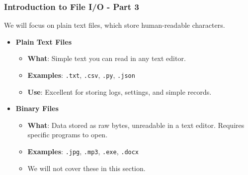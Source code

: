\documentclass{beamer}
\begin{document}
\begin{frame}[fragile]
    \frametitle{Introduction to File I/O - Part 3}
    \subtitle{What Kind of Files Will We Use?}
    
    We will focus on plain text files, which store human-readable characters.
    
    \begin{itemize}
        \item \textbf{Plain Text Files}
        \begin{itemize}
            \item \textbf{What}: Simple text you can read in any text editor.
            \item \textbf{Examples}: \texttt{.txt}, \texttt{.csv}, \texttt{.py}, \texttt{.json}
            \item \textbf{Use}: Excellent for storing logs, settings, and simple records.
        \end{itemize}
        
        \vspace{1em}
        
        \item \textbf{Binary Files}
        \begin{itemize}
            \item \textbf{What}: Data stored as raw bytes, unreadable in a text editor. Requires specific programs to open.
            \item \textbf{Examples}: \texttt{.jpg}, \texttt{.mp3}, \texttt{.exe}, \texttt{.docx}
            \item We will not cover these in this section.
        \end{itemize}
    \end{itemize}
    
\end{frame}
\end{document}
